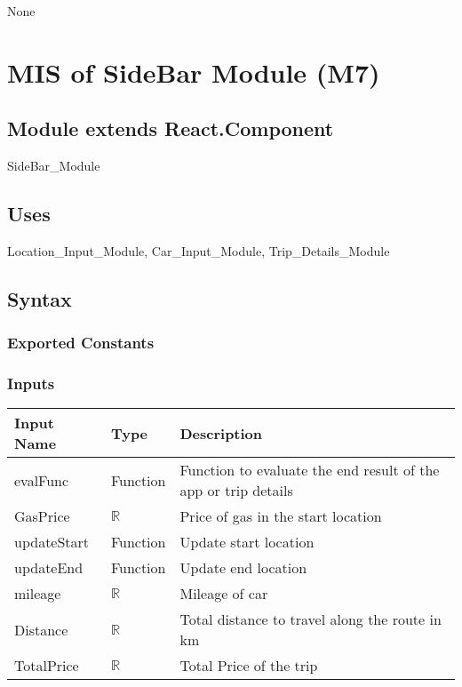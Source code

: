 \documentclass[12pt, titlepage]{article}
\begin{document}
None

\newpage



\section{MIS of SideBar Module (M7)} 

\label{Module} 

\subsection{Module extends React.Component}

SideBar\_Module

\subsection{Uses}

Location\_Input\_Module, Car\_Input\_Module, Trip\_Details\_Module

\subsection{Syntax}

\subsubsection{Exported Constants}

\subsubsection{Inputs}
\begin{tabular}{| l | l | l |}
  \hline
  \textbf{Input Name} & \textbf{Type} & \textbf{Description}\\
  \hline
  evalFunc & Function & Function to evaluate the end result of the app or trip details \\
  \hline
  GasPrice & $\mathbb{R}$ & Price of gas in the start location \\
  \hline
  updateStart & Function & Update start location \\
  \hline
  updateEnd & Function & Update end location \\
  \hline
  mileage & $\mathbb{R}$ & Mileage of car \\
  \hline
  Distance & $\mathbb{R}$  & Total distance to travel along the route in km \\
  \hline
  TotalPrice & $\mathbb{R}$ & Total Price of the trip \\
  \hline
\end{tabular}
\end{document}
